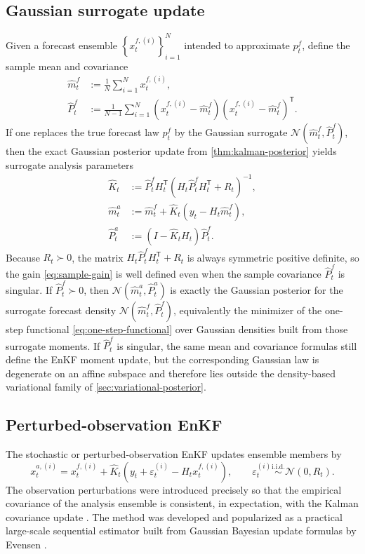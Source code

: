 \documentclass[11pt]{article}
\newcommand{\Id}{I}
\newcommand{\set}[1]{\left\{ #1 \right\}}
\newcommand{\parens}[1]{\left( #1 \right)}
\newcommand{\transpose}{^{\mathsf T}}
\numberwithin{equation}{section}
\theoremstyle{plain}
\theoremstyle{definition}
\theoremstyle{remark}
\begin{document}
\subsection{Gaussian surrogate update}

Given a forecast ensemble $\set{x_t^{f,(i)}}_{i=1}^{N}$ intended to approximate $p_t^f$, define the sample mean and covariance
\begin{align}
\hat m_t^f &:= \frac1N\sum_{i=1}^{N} x_t^{f,(i)}, \\
\hat P_t^f &:= \frac{1}{N-1}\sum_{i=1}^{N}\parens{x_t^{f,(i)}-\hat m_t^f}\parens{x_t^{f,(i)}-\hat m_t^f}\transpose.
\end{align}
If one replaces the true forecast law $p_t^f$ by the Gaussian surrogate $\mathcal N(\hat m_t^f,\hat P_t^f)$, then the exact Gaussian posterior update from \cref{thm:kalman-posterior} yields surrogate analysis parameters
\begin{align}
\hat K_t &:= \hat P_t^fH_t\transpose\parens{H_t\hat P_t^fH_t\transpose + R_t}^{-1}, \label{eq:sample-gain}\\
\hat m_t^a &:= \hat m_t^f + \hat K_t\parens{y_t-H_t\hat m_t^f}, \label{eq:sample-mean-update}\\
\hat P_t^a &:= \parens{\Id-\hat K_tH_t}\hat P_t^f. \label{eq:sample-cov-update}
\end{align}
Because $R_t\succ 0$, the matrix $H_t\hat P_t^fH_t\transpose+R_t$ is always symmetric positive definite, so the gain \cref{eq:sample-gain} is well defined even when the sample covariance $\hat P_t^f$ is singular. If $\hat P_t^f\succ 0$, then $\mathcal N(\hat m_t^a,\hat P_t^a)$ is exactly the Gaussian posterior for the surrogate forecast density $\mathcal N(\hat m_t^f,\hat P_t^f)$, equivalently the minimizer of the one-step functional \cref{eq:one-step-functional} over Gaussian densities built from those surrogate moments. If $\hat P_t^f$ is singular, the same mean and covariance formulas still define the EnKF moment update, but the corresponding Gaussian law is degenerate on an affine subspace and therefore lies outside the density-based variational family of \cref{sec:variational-posterior}.

\subsection{Perturbed-observation EnKF}

The stochastic or perturbed-observation EnKF updates ensemble members by
\begin{equation}
x_t^{a,(i)}
=
x_t^{f,(i)}+\hat K_t\parens{y_t+\varepsilon_t^{(i)}-H_tx_t^{f,(i)}},
\qquad
\varepsilon_t^{(i)}\stackrel{\text{i.i.d.}}{\sim}\mathcal N(0,R_t).
\label{eq:stochastic-enkf}
\end{equation}
The observation perturbations were introduced precisely so that the empirical covariance of the analysis ensemble is consistent, in expectation, with the Kalman covariance update \citep{burgers1998}. The method was developed and popularized as a practical large-scale sequential estimator built from Gaussian Bayesian update formulas by Evensen \cite{evensen2003}.
\end{document}
